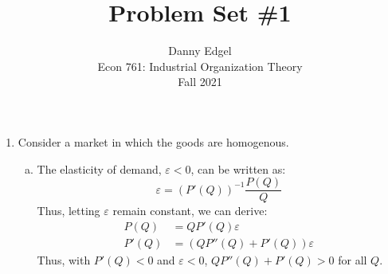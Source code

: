 \documentclass{article}
\begin{document}
\title{	Problem Set \#1 }
\author{ 		Danny Edgel 						\\ 
			Econ 761: Industrial Organization Theory	\\
			Fall 2021						\\
		}
\maketitle\thispagestyle{empty}



\begin{enumerate}
	\item Consider a market in which the goods are homogenous.
  \begin{enumerate}[(a)]
    \item The elasticity of demand, $\varepsilon<0$, can be written as: 
              \[ \varepsilon = \left(P'(Q)\right)^{-1}\frac{P(Q)}{Q} \]
      Thus, letting $\varepsilon$ remain constant, we can derive:
      \begin{align*}
        P(Q)	&= QP'(Q)\varepsilon				\\
        P'(Q)	&= \left(QP''(Q) + P'(Q)\right)\varepsilon
      \end{align*}
      Thus, with $P'(Q)<0$ and $\varepsilon<0$, ${QP''(Q) + P'(Q)>0}$ for all $Q$.


\end{enumerate}
\end{enumerate}
\end{document}
